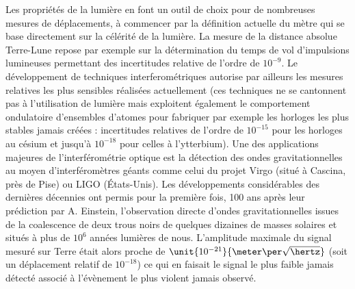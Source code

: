 \documentclass[12pt,a4paper]{article}
\begin{document}
Les propriétés de la lumière en font un outil de choix pour de nombreuses mesures de déplacements, à commencer par la définition actuelle du mètre qui se base directement sur la célérité de la lumière.
La mesure de la distance absolue Terre-Lune repose par exemple sur la détermination du temps de vol d'impulsions lumineuses permettant des incertitudes relative de l'ordre de $10^{-9}$.
Le développement de techniques interferométriques autorise par ailleurs les mesures relatives les plus sensibles réalisées actuellement (ces techniques ne se cantonnent pas à l'utilisation de lumière mais exploitent également le comportement ondulatoire d'ensembles d'atomes pour fabriquer par exemple les horloges les plus stables jamais créées : incertitudes relatives de l'ordre de $10^{-15}$ pour les horloges au césium et jusqu'à $10^{-18}$ pour celles à l'ytterbium).
Une des applications majeures de l'interférométrie optique est la détection des ondes gravitationnelles au moyen d'interféromètres géants comme celui du projet Virgo (situé à Cascina, près de Pise) ou LIGO (États-Unis).
Les développements considérables des dernières décennies ont permis pour la première fois, 100 ans après leur prédiction par A. Einstein, l'observation directe d'ondes gravitationnelles issues de la coalescence de deux trous noirs de quelques dizaines de masses solaires et situés à plus de $10^6$ années lumières de nous.
L'amplitude maximale du signal mesuré sur Terre était alors proche de $\unit{10^{-21}}{\meter\per\sqrt{\hertz}}$ (soit un déplacement relatif de $10^{-18}$) ce qui en faisait le signal le plus faible jamais détecté associé à l'évènement le plus violent jamais observé.
\end{document}
